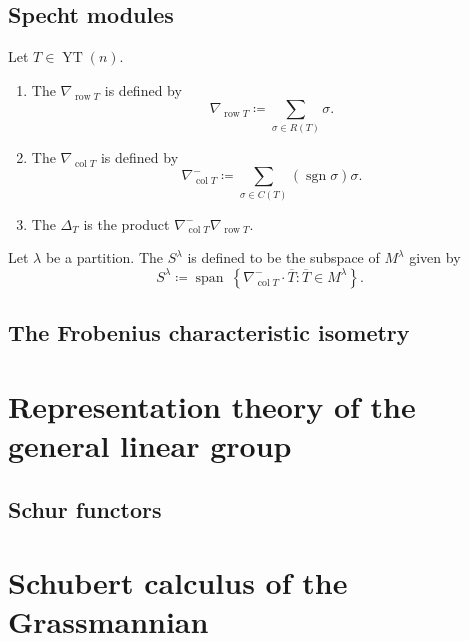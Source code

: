 \documentclass{article}
\DeclareMathOperator{\row}{row}
\DeclareMathOperator{\col}{col}
\DeclareMathOperator{\sgn}{sgn}
\DeclareMathOperator{\YT}{YT}
\begin{document}
\subsection{Specht modules}

\begin{definition}
    Let $T \in \YT(n)$.
    \begin{enumerate}[label=(\alph*)]
        \item 
            The  $\nabla_{\row T}$ is defined by
            \[
                \nabla_{\row T}
                \coloneq
                \sum_{\sigma \in R(T)}
                \sigma.
            \]
        \item 
            The  $\nabla_{\col T}$ is defined by
            \[
                \nabla_{\col T}^-
                \coloneq
                \sum_{\sigma \in C(T)}
                (\sgn \sigma)\sigma.
            \]
        \item 
            The  $\Delta_T$ is the product $\nabla_{\col T}^- \nabla_{\row T}$.
    \end{enumerate}
\end{definition}

\begin{definition}
    Let $\lambda$ be a partition.
    The  $S^\lambda$ is defined to be the subspace of $M^\lambda$ given by
    \[
        S^\lambda
        \coloneq
        \operatorname{span}\
        \left\{
            \nabla_{\col T}^- \cdot \overline{T} :
            \overline{T} \in M^\lambda
        \right\}.
    \]
\end{definition}

\subsection{The Frobenius characteristic isometry}

\section{Representation theory of the general linear group}

\subsection{Schur functors}

\section{Schubert calculus of the Grassmannian}
\end{document}
